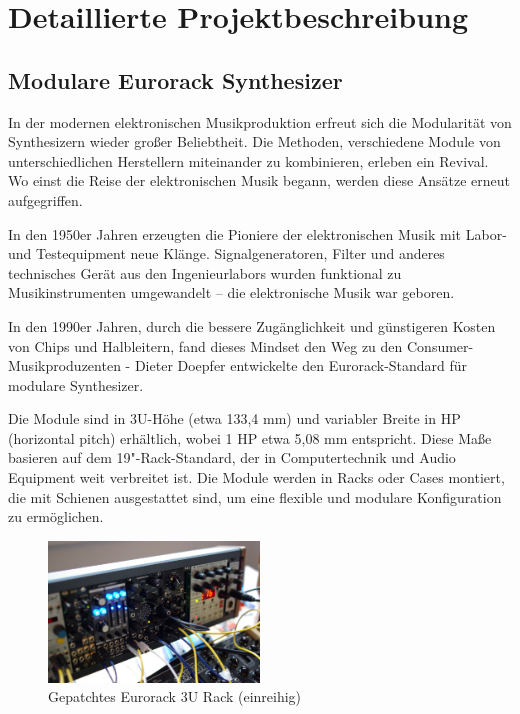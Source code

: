 \newpage
\section{Detaillierte Projektbeschreibung}

	\subsection{Modulare Eurorack Synthesizer}
	
	In der modernen elektronischen Musikproduktion erfreut sich die Modularität von Synthesizern wieder großer Beliebtheit. 
	Die Methoden, verschiedene Module von unterschiedlichen Herstellern miteinander zu kombinieren, erleben ein Revival. 
	Wo einst die Reise der elektronischen Musik begann, werden diese Ansätze erneut aufgegriffen.
	
	In den 1950er Jahren erzeugten die Pioniere der elektronischen Musik mit Labor- und Testequipment neue Klänge. 
	Signalgeneratoren, Filter und anderes technisches Gerät aus den Ingenieurlabors wurden funktional zu Musikinstrumenten umgewandelt – die elektronische Musik war geboren.
	
	In den 1990er Jahren, durch die bessere Zugänglichkeit und günstigeren Kosten von Chips und Halbleitern, fand dieses Mindset den Weg zu den Consumer-Musikproduzenten - Dieter Doepfer entwickelte den Eurorack-Standard für modulare Synthesizer. 
	
	Die Module sind in 3U-Höhe (etwa 133,4 mm) und variabler Breite in HP (horizontal pitch) erhältlich, wobei 1 HP etwa 5,08 mm entspricht. Diese Maße basieren auf dem 19"-Rack-Standard, der in Computertechnik und Audio Equipment weit verbreitet ist. Die Module werden in Racks oder Cases montiert, die mit Schienen ausgestattet sind, um eine flexible und modulare Konfiguration zu ermöglichen.
	
	
	\begin{figure}[h!]
		\centering
		\includegraphics[width=0.5\textwidth]{images/02_detaillierte-projektbeschr/eurorack-patched}
		\caption{Gepatchtes Eurorack 3U Rack (einreihig)}
		\label{fig:eurorack-patched}
	\end{figure}
	
